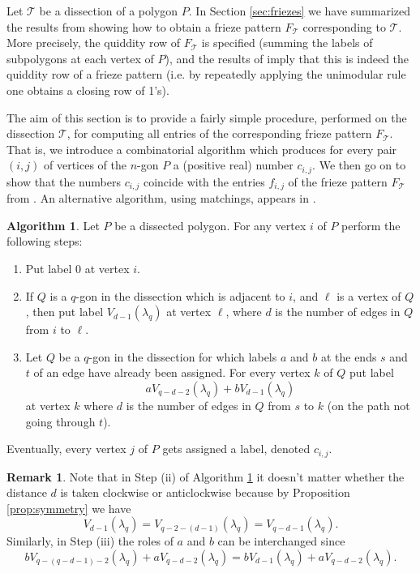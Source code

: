 \documentclass[11pt,a4paper]{amsart}
\theoremstyle{definition}
\newtheorem{Remark}[Lemma]{Remark}
\newtheorem{Algorithm}[Lemma]{Algorithm}
\numberwithin{equation}{section}
\begin{document}
Let $\mathcal{T}$ be a dissection of a polygon $P$. 
In Section \ref{sec:friezes} we have summarized the results from \cite{HJ17} showing how to obtain a frieze
pattern $F_{\mathcal{T}}$ corresponding to $\mathcal{T}$. More precisely, the quiddity row of $F_{\mathcal{T}}$
is specified (summing the labels of subpolygons at each vertex of $P$), and the results of \cite{HJ17} imply
that this is indeed the quiddity row of a frieze pattern (i.e. by repeatedly applying the unimodular rule 
one obtains a closing row of 1's).  

\smallskip

The aim of this section is to provide a fairly simple procedure, performed on the dissection $\mathcal{T}$, 
for computing all entries of the corresponding frieze pattern $F_{\mathcal{T}}$. That is,
we introduce a combinatorial algorithm which produces for every pair $(i,j)$ of vertices 
of the $n$-gon $P$ a (positive real) number $c_{i,j}$. We then go on to show that the numbers $c_{i,j}$
coincide with the entries $f_{i,j}$ of the frieze pattern $F_{\mathcal{T}}$ from \cite{HJ17}. An alternative algorithm,
using matchings, appears in \cite[Section 6]{BC21}.


\begin{Algorithm} \label{alg:frieze}
Let $P$ be a dissected polygon. For any vertex $i$ of $P$ perform the following steps:
\begin{enumerate}
\item[{(i)}] Put label 0 at vertex $i$. 
\item[{(ii)}] If $Q$ is a $q$-gon in the dissection which is adjacent to $i$, and $\ell$ is a vertex of $Q$, then put label
$V_{d-1}(\lambda_q)$ at vertex $\ell$, where $d$ is the number of edges in $Q$ from $i$ to $\ell$. 
\item[{(iii)}] Let $Q$ be a $q$-gon in the dissection for which labels $a$ and $b$ at the ends $s$ and $t$ of an edge
have already been assigned.
For every vertex $k$ of $Q$ put label 
$$aV_{q-d-2}(\lambda_q) + bV_{d-1}(\lambda_q)$$
at vertex $k$ where $d$ is the number of edges in $Q$ from $s$ to $k$ (on the path not going through $t$).
\end{enumerate}
Eventually, every vertex $j$ of $P$ gets assigned a label, denoted $c_{i,j}$. 
\end{Algorithm}

\begin{Remark}
Note that in Step (ii) of Algorithm \ref{alg:frieze} it doesn't matter whether the distance $d$ is taken clockwise
or anticlockwise because by Proposition \ref{prop:symmetry} we have 
$$V_{d-1}(\lambda_q) = V_{q-2-(d-1)}(\lambda_q) = V_{q-d-1}(\lambda_q).
$$
Similarly, in Step (iii) the roles of $a$ and $b$ can be interchanged since
$$b V_{q-(q-d-1)-2}(\lambda_q) + a V_{q-d-2}(\lambda_q) = b V_{d-1}(\lambda_q)+aV_{q-d-2}(\lambda_q).
$$
\end{Remark}
\end{document}
